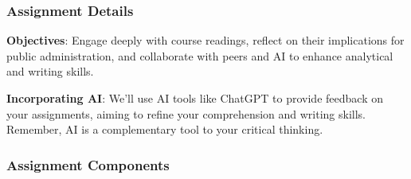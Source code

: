 \documentclass[12pt, letterpaper]{article}
\begin{document}
\subsubsection*{Assignment Details}

\textbf{Objectives}: Engage deeply with course readings, reflect on their implications for public administration, and collaborate with peers and AI to enhance analytical and writing skills.
\vspace{0.5em}

\noindent \textbf{Incorporating AI}: We'll use AI tools like ChatGPT to provide feedback on your assignments, aiming to refine your comprehension and writing skills. Remember, AI is a complementary tool to your critical thinking.

\subsubsection*{Assignment Components}
\end{document}
